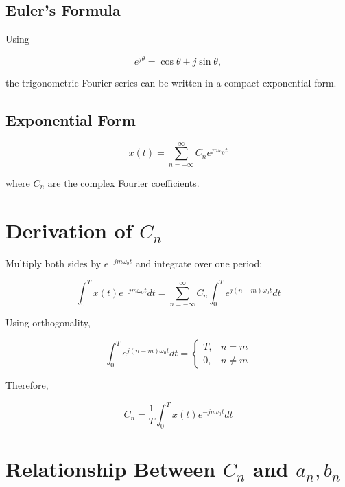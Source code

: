 
\subsection{Euler's Formula}

Using

\[
e^{j\theta}=\cos\theta+j\sin\theta,
\]

the trigonometric Fourier series can be written in a compact exponential form.


\subsection{Exponential Form}

\[
\boxed{
x(t)=\sum_{n=-\infty}^{\infty}C_n e^{jn\omega_0 t}
}
\]

where \(C_n\) are the complex Fourier coefficients.


\section{Derivation of \(C_n\)}

Multiply both sides by \(e^{-jm\omega_0 t}\) and integrate over one period:

\[
\int_0^T x(t)e^{-jm\omega_0 t}dt
=
\sum_{n=-\infty}^{\infty}
C_n
\int_0^T
e^{j(n-m)\omega_0 t}dt
\]

Using orthogonality,

\[
\int_0^T e^{j(n-m)\omega_0 t}dt=
\begin{cases}
T, & n=m\\
0, & n\neq m
\end{cases}
\]

Therefore,

\[
\boxed{
C_n=
\frac{1}{T}
\int_0^T
x(t)e^{-jn\omega_0 t}dt
}
\]


\section{Relationship Between \(C_n\) and \(a_n,b_n\)}

